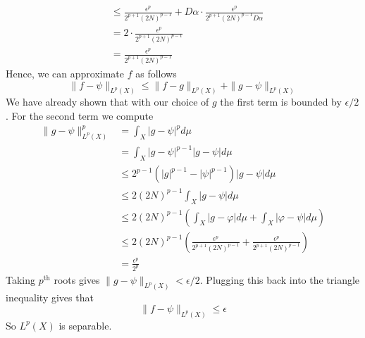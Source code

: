 \documentclass{article}
\newcommand{\norm}[1]{\|#1\|}
\begin{document}
\begin{enumerate}
\begin{align*}
    &\leq \frac{\epsilon^p}{2^{p+1}(2N)^{p-1}} + D\alpha\cdot
    \frac{\epsilon^p}{2^{p+1}(2N)^{p-1}D\alpha} \\
    &= 2\cdot \frac{\epsilon^p}{2^{p+1}(2N)^{p-1}} \\
    &= \frac{\epsilon^p}{2^{p+1}(2N)^{p-1}}
  \end{align*}
  Hence, we can approximate $f$ as follows
  \[
  \norm{f - \psi}_{L^p(X)} \leq \norm{f - g}_{L^p(X)} + \norm{g - \psi}_{L^p(X)}
  \]
  We have already shown that with our choice of $g$ the first term is
  bounded by $\epsilon/2$. For the second term we compute
  \begin{align*}
    \norm{g - \psi}_{L^p(X)}^p &= \int_X |g - \psi|^pd\mu \\
    &= \int_X |g - \psi|^{p-1}|g-\psi|d\mu \\
    &\leq 2^{p-1}(|g|^{p-1} - |\psi|^{p-1})|g - \psi|d\mu \\
    &\leq 2(2N)^{p-1}\int_X|g-\psi|d\mu \\
    &\leq 2(2N)^{p-1}\left(\int_X |g - \varphi|d\mu + \int_X |\varphi -
      \psi|d\mu\right) \\
    &\leq 2(2N)^{p-1}\left(\frac{\epsilon^p}{2^{p+1}(2N)^{p-1}} +
      \frac{\epsilon^p}{2^{p+1}(2N)^{p-1}}\right) \\
    &= \frac{\epsilon^p}{2^p}
  \end{align*}
  Taking $p^{\text{th}}$ roots gives $\norm{g - \psi}_{L^p(X)} <
  \epsilon/2$. Plugging this back into the triangle inequality gives that
  \[
  \norm{f - \psi}_{L^p(X)} \leq \epsilon
  \]
  So $L^p(X)$ is separable.
\end{enumerate}
\end{document}
